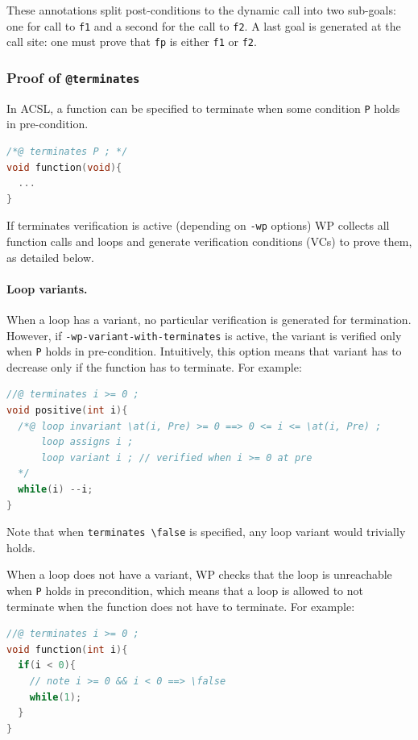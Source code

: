 These annotations split post-conditions to the dynamic call into two sub-goals: one for call to \verb+f1+ and
a second for the call to \verb+f2+. A last goal is generated at the call
site: one must prove that \verb+fp+ is either \verb+f1+ or \verb+f2+.

\subsubsection{Proof of \texttt{@terminates}}
\label{ss-sec:plugin-terminates}

In ACSL, a function can be specified to terminate when some condition \verb+P+ holds
in pre-condition.

\begin{lstlisting}[language=c, alsolanguage=acsl]
/*@ terminates P ; */
void function(void){
  ...
}
\end{lstlisting}

If terminates verification is active (depending on \verb+-wp+ options) WP collects all function calls and loops
and generate verification conditions (VCs) to prove them, as detailed below.

\paragraph{Loop variants.} When a loop has a variant, no particular verification
is generated for termination. However, if \verb+-wp-variant-with-terminates+ is
active, the variant is verified only when \verb+P+ holds in pre-condition.
Intuitively, this option means that variant has to decrease only if the function has to terminate. For example:

\begin{lstlisting}[language=c, alsolanguage=acsl]
//@ terminates i >= 0 ;
void positive(int i){
  /*@ loop invariant \at(i, Pre) >= 0 ==> 0 <= i <= \at(i, Pre) ;
      loop assigns i ;
      loop variant i ; // verified when i >= 0 at pre
  */
  while(i) --i;
}
\end{lstlisting}

Note that when \verb+terminates \false+ is specified, any loop
variant would trivially holds.

When a loop does not have a variant, WP checks that the loop is unreachable
when \verb+P+ holds in precondition, which means that a loop is allowed to not
terminate when the function does not have to terminate. For example:

\begin{lstlisting}[language=c, alsolanguage=acsl]
//@ terminates i >= 0 ;
void function(int i){
  if(i < 0){
    // note i >= 0 && i < 0 ==> \false
    while(1);
  }
}
\end{lstlisting}


